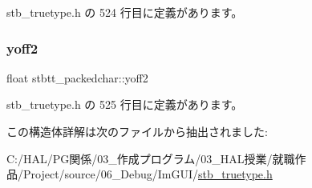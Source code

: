  stb\+\_\+truetype.\+h の 524 行目に定義があります。

\mbox{\label{structstbtt__packedchar_a2ec5bbd1010c9a9b7cbdeb7503dcaffa}} 
\subsubsection{\texorpdfstring{yoff2}{yoff2}}
{\footnotesize\ttfamily float stbtt\+\_\+packedchar\+::yoff2}



 stb\+\_\+truetype.\+h の 525 行目に定義があります。



この構造体詳解は次のファイルから抽出されました\+:\begin{DoxyCompactItemize}
\item 
C\+:/\+H\+A\+L/\+P\+G関係/03\+\_\+作成プログラム/03\+\_\+\+H\+A\+L授業/就職作品/\+Project/source/06\+\_\+\+Debug/\+Im\+G\+U\+I/\mbox{\hyperlink{stb__truetype_8h}{stb\+\_\+truetype.\+h}}\end{DoxyCompactItemize}
